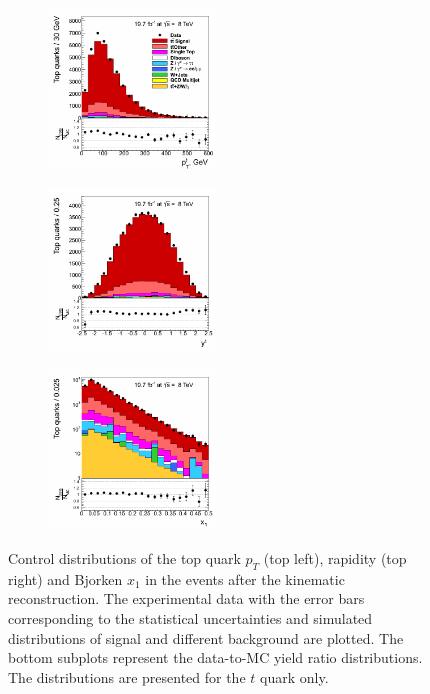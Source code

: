 \begin{figure}[h]
\centering
\begin{subfigure}
  \centering
  \includegraphics[width=0.49\textwidth]{05_kinReco/plots/CP_top_pt.png}
\end{subfigure}
\begin{subfigure}
  \centering
  \includegraphics[width=0.49\textwidth]{05_kinReco/plots/CP_top_rapidity.png}
\end{subfigure}
\begin{subfigure}
  \centering
  \includegraphics[width=0.49\textwidth]{05_kinReco/plots/CP_x1.png}
\end{subfigure}
\caption{Control distributions of the top quark $p_{T}$ (top left), rapidity (top right) and Bjorken $x_{1}$ in the events 
 after the kinematic reconstruction. The experimental data with the error bars corresponding to the statistical uncertainties
 and simulated distributions of signal and different background are plotted. The bottom subplots represent the data-to-MC yield ratio distributions. 
 The distributions are presented for the $t$ quark only.}
\label{fig:CPkinTop}
\end{figure}

